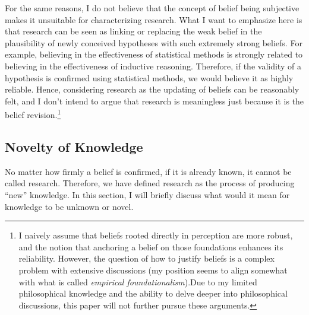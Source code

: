 For the same reasons, I do not believe that the concept of belief being subjective makes it unsuitable for characterizing research. What I want to emphasize here is that research can be seen as linking or replacing the weak belief in the plausibility of newly conceived hypotheses with such extremely strong beliefs. For example, believing in the effectiveness of statistical methods is strongly related to believing in the effectiveness of inductive reasoning. Therefore, if the validity of a hypothesis is confirmed using statistical methods, we would believe it as highly reliable. Hence, considering research as the updating of beliefs can be reasonably felt, and I don't intend to argue that research is meaningless just because it is the belief revision.\footnote{
I naively assume that beliefs rooted directly in perception are more robust, and the notion that anchoring a belief on those foundations enhances its reliability. However, the question of how to justify beliefs is a complex problem with extensive discussions \cite{sep-epistemology} (my position seems to align somewhat with what is called \textit{empirical foundationalism}).Due to my limited philosophical knowledge and the ability to delve deeper into philosophical discussions, this paper will not further pursue these arguments.
}




\subsection{Novelty of Knowledge}
No matter how firmly a belief is confirmed, if it is already known, it cannot be called research. Therefore, we have defined research as the process of producing ``new'' knowledge. In this section, I will briefly discuss what would it mean for knowledge to be unknown or novel.

